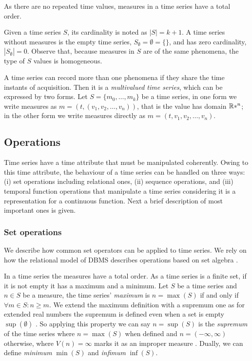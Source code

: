 As there are no repeated time values, measures in a time series have a
total order.

Given a time series $S$, its cardinality is noted as $|S|=k+1$.  A
time series without measures is the empty time series,
$S_\emptyset=\emptyset=\{\}$, and has zero cardinality,
$|S_\emptyset|=0$.  Observe that, because measures in $S$ are of the
same phenomena, the type of $S$ values is homogeneous.



A time series can record more than one phenomena if they share the
time instants of acquisition. Then it is a \emph{multivalued time
series}, which can be expressed by two forms. Let $S = \{m_0, \ldots,
m_k\}$ be a time series, in one form we write measures as
$m=(t,(v_1,v_2,\ldots,v_n))$, that is the value has domain $\mathbb{R}*^n$; in
the other form we write measures directly as
$m=(t,v_1,v_2,\ldots,v_n)$.




\subsection{Operations}

Time series have a time attribute that must be manipulated
coherently. Owing to this time attribute, the behaviour of a time
series can be handled on three ways: (i) set operations including
relational ones, (ii) sequence operations, and (iii) temporal function
operations that manipulate a time series considering it is a
representation for a continuous function. Next a brief description of
most important ones is given.



\subsubsection{Set operations}

We describe how common set operators can be applied to time series. We
rely on how the relational model of DBMS describes operations based on
set algebra \cite{date:introduction}.




In a time series the measures have a total order.  As a time series is
a finite set, if it is not empty it has a maximum and a minimum.  Let
$S$ be a time series and $n\in S$ be a measure, the time series'
\emph{maximum} is $n=\max(S)$ if and only if $\forall m \in S: n \geq
m $.  We extend the maximum definition with a supremum one as for
extended real numbers the supremum is defined even when a set is empty
$\sup(\emptyset)$ \cite{cantrell:extendedreal}. So applying this
property we can say $n=\sup(S)$ is the \emph{supremum} of the time
series where $n=\max(S)$ when defined and $n=(-\infty,\infty)$
otherwise, where $V(n)=\infty$ marks it as an improper measure \todo{}.  Dually, we can define \emph{minimum} $\min(S)$ and
\emph{infimum} $\inf(S)$.




